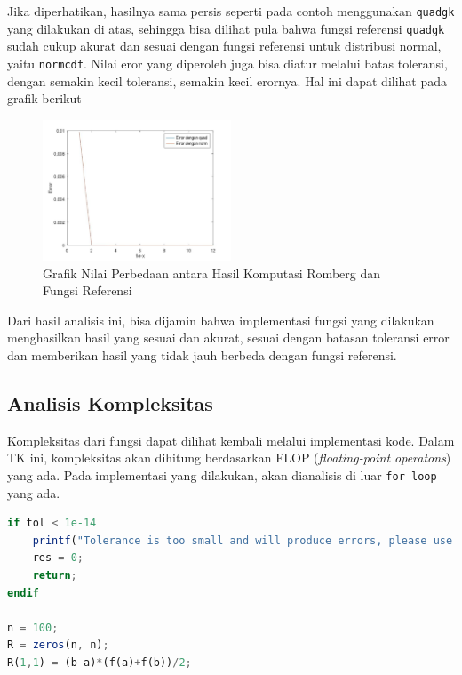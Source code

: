 \documentclass[journal,12pt,onecolumn,a4paper]{IEEEtran}
\begin{document}
Jika diperhatikan, hasilnya sama persis seperti pada contoh menggunakan \lstinline{quadgk} yang dilakukan di atas, sehingga bisa dilihat pula bahwa fungsi referensi \lstinline{quadgk} sudah cukup akurat dan sesuai dengan fungsi referensi untuk distribusi normal, yaitu \lstinline{normcdf}.
Nilai eror yang diperoleh juga bisa diatur melalui batas toleransi, dengan semakin kecil toleransi, semakin kecil erornya. Hal ini dapat dilihat pada grafik berikut
\begin{figure}[h]
	\centering
	\includegraphics[width=0.5\textwidth]{quadnorm_romberg}
	\caption{Grafik Nilai Perbedaan antara Hasil Komputasi Romberg dan Fungsi Referensi}
	\label{fig:difGraph}
\end{figure}

Dari hasil analisis ini, bisa dijamin bahwa implementasi fungsi yang dilakukan menghasilkan hasil yang sesuai dan akurat, sesuai dengan batasan toleransi error dan memberikan hasil yang tidak jauh berbeda dengan fungsi referensi.

\subsection{Analisis Kompleksitas}
Kompleksitas dari fungsi dapat dilihat kembali melalui implementasi kode. Dalam TK ini, kompleksitas akan dihitung berdasarkan FLOP (\emph{floating-point operatons}) yang ada.
Pada implementasi yang dilakukan, akan dianalisis di luar \lstinline{for loop} yang ada.
\begin{center}
	\begin{lstlisting}[language=Octave]
if tol < 1e-14
	printf("Tolerance is too small and will produce errors, please use larger values\n")
	res = 0;
	return;
endif

n = 100;
R = zeros(n, n);
R(1,1) = (b-a)*(f(a)+f(b))/2;
	\end{lstlisting}
\end{center}
\end{document}
